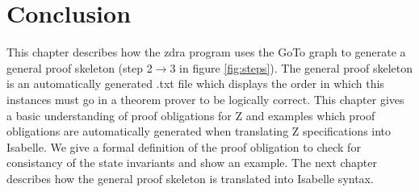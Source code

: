 \section{Conclusion}
\label{sec:skeletonsConclusion}

This chapter describes how the \gls{zdra} program uses the GoTo graph to generate a general proof skeleton (step 2$\rightarrow$3 in figure \ref{fig:steps}). The general proof skeleton is an automatically generated .txt file which displays the order in which this instances must go in a theorem prover to be logically correct. This chapter gives a basic understanding of proof obligations for Z and examples which proof obligations are automatically generated when translating Z specifications into Isabelle. We give a formal definition of the proof obligation to check for consistancy of the state invariants and show an example. The next chapter describes how the general proof skeleton is translated into Isabelle syntax.